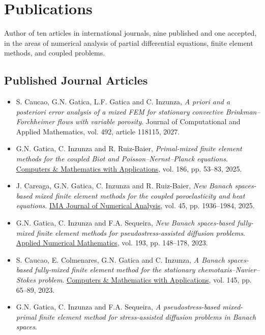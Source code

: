 \documentclass[letterpaper,12pt]{article}
\newcommand{\PubSpace}{\vspace{0.3mm}}
\begin{document}
\section{Publications}

Author of ten articles in international journals, nine published and one accepted, in the areas of numerical analysis of partial differential equations, finite element methods, and coupled problems.

\subsection*{Published Journal Articles}
\begin{itemize}
\item {\sc S. Caucao, G.N. Gatica, L.F. Gatica and C. Inzunza},
    {\it A priori and a posteriori error analysis of a mixed FEM for stationary convective Brinkman--Forchheimer flows with variable porosity}.
    Journal of Computational and Applied Mathematics, vol. 492, article 118115, 2027.
\PubSpace
\item {\sc G.N. Gatica, C. Inzunza and R. Ruiz-Baier},
    {\it Primal-mixed finite element methods for the coupled Biot and Poisson--Nernst--Planck equations}.
    \href{https://doi.org/10.1016/j.camwa.2025.03.004}{Computers \& Mathematics with Applications}, vol. 186, pp. 53--83, 2025.
\PubSpace
\item {\sc J. Careaga, G.N. Gatica, C. Inzunza and R. Ruiz-Baier},
    {\it New Banach spaces-based mixed finite element methods for the coupled poroelasticity and heat equations}.
    \href{https://doi.org/10.1093/imanum/drae052}{IMA Journal of Numerical Analysis}, vol. 45, pp. 1936--1984, 2025.
\PubSpace
\item {\sc G.N. Gatica, C. Inzunza and F.A. Sequeira},
    {\it New Banach spaces-based fully-mixed finite element methods for pseudostress-assisted diffusion problems}.
    \href{https://doi.org/10.1016/j.apnum.2023.07.017}{Applied Numerical Mathematics}, vol. 193, pp. 148--178, 2023.
\PubSpace
\item {\sc S. Caucao, E. Colmenares, G.N. Gatica and C. Inzunza},
    {\it A Banach spaces-based fully-mixed finite element method for the stationary chemotaxis--Navier--Stokes problem}.
    \href{https://doi.org/10.1016/j.camwa.2023.06.006}{Computers \& Mathematics with Applications}, vol. 145, pp. 65--89, 2023.
\PubSpace
\item {\sc G.N. Gatica, C. Inzunza and F.A. Sequeira},
    {\it A pseudostress-based mixed-primal finite element method for stress-assisted diffusion problems in Banach spaces}.

\end{itemize}
\end{document}
